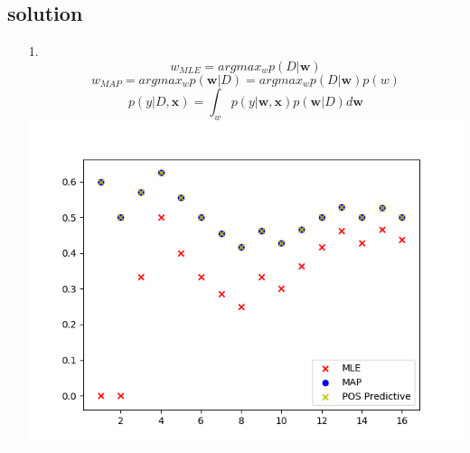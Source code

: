 \documentclass[submit]{harvardml}
\begin{document}
\subsection{solution}
\begin{enumerate}
    \item[1.]
        $$w_{MLE} = argmax_w p(D|\mathbf{w})$$
        $$w_{MAP} = argmax_w p(\mathbf{w}|D) = argmax_w p(D|\mathbf{w})p(w)$$
        $$p(y|D,\mathbf{x}) = \int_{w} p(y|\mathbf{w},\mathbf{x})
        p(\mathbf{w}|D)d\mathbf{w}$$
        \includegraphics[scale=.7]{prob1_1.png}


\end{enumerate}
\end{document}
